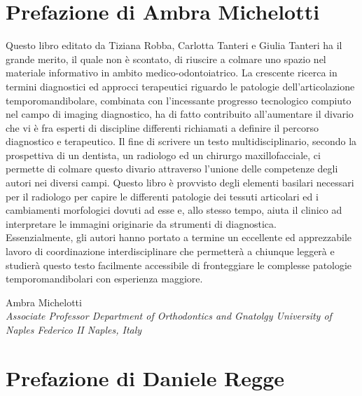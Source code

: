 \documentclass[leqno,10pt,twocolumn,a4paper]{article}
\begin{document}
	\newpage
	
	\thispagestyle{plain}
	
	\section*{Prefazione di Ambra Michelotti}
	
	\vspace*{0.5cm}
	Questo libro editato da Tiziana Robba, Carlotta Tanteri e Giulia Tanteri ha il grande merito, il quale non è scontato, di riuscire a colmare uno spazio nel materiale informativo in ambito medico-odontoiatrico. La crescente ricerca in termini diagnostici ed approcci
	terapeutici riguardo le patologie dell'articolazione temporomandibolare, combinata con l'incessante progresso tecnologico compiuto nel campo di imaging diagnostico, ha di fatto contribuito all'aumentare il divario che vi è fra esperti di discipline differenti
	richiamati a definire il percorso diagnostico e terapeutico. Il fine di scrivere un testo multidisciplinario, secondo la prospettiva di un dentista, un radiologo ed un chirurgo maxillofacciale, ci permette di colmare questo divario attraverso l'unione delle
	competenze degli autori nei diversi campi. Questo libro è provvisto degli elementi basilari necessari per il radiologo per capire le differenti patologie dei tessuti articolari ed i cambiamenti morfologici dovuti ad esse e, allo stesso tempo, aiuta il clinico ad
	interpretare le immagini originarie da strumenti di diagnostica.\\
	Essenzialmente, gli autori hanno portato a termine un eccellente ed apprezzabile lavoro di coordinazione interdisciplinare che permetterà a chiunque leggerà e studierà questo testo facilmente accessibile di fronteggiare le complesse patologie
	temporomandibolari con esperienza maggiore.
	\begin{flushright}
		Ambra Michelotti\\
		\textit{\footnotesize{Associate Professor Department of Orthodontics and Gnatolgy University of Naples Federico II Naples, Italy}}
	\end{flushright}
	
	\newpage
	
	\thispagestyle{plain}
	
	\section*{Prefazione di Daniele Regge}
	
\end{document}
